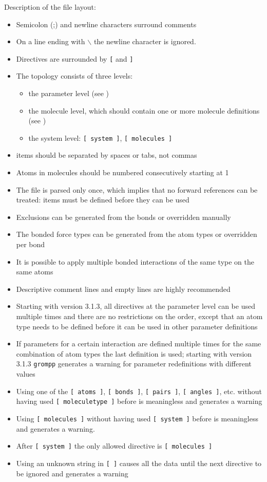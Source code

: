 Description of the file layout:
\begin{itemize}
\item Semicolon (;) and newline characters surround comments
\item On a line ending with $\backslash$ the newline character is ignored.
\item Directives are surrounded by {\tt [} and {\tt ]}
\item The topology consists of three levels:
\begin{itemize}
\item the parameter level (see )
\item the molecule level, which should contain one or more molecule
      definitions (see )
\item the system level: {\tt [~system~]}, {\tt [~molecules~]}
\end{itemize}
\item items should be separated by spaces or tabs, not commas
\item Atoms in molecules should be numbered consecutively starting at 1
\item The file is parsed only once, which implies that no forward
      references can be treated: items must be defined before they
      can be used
\item Exclusions can be generated from the bonds or
      overridden manually
\item The bonded force types can be generated from the atom types or
      overridden per bond
\item It is possible to apply multiple bonded interactions of the same type
      on the same atoms
\item Descriptive comment lines and empty lines are highly recommended
\item Starting with {\gromacs} version 3.1.3, all directives at the
      parameter level can be used multiple times and there are no
      restrictions on the order, except that an atom type needs to be
      defined before it can be used in other parameter definitions
\item If parameters for a certain interaction are defined multiple times
      for the same combination of atom types the last definition is used;
      starting with {\gromacs} version 3.1.3 {\tt grompp} generates a
      warning for parameter redefinitions with different values
\item Using one of the {\tt [~atoms~]}, {\tt [~bonds~]},
      {\tt [~pairs~]}, {\tt [~angles~]}, etc. without having used
      {\tt [~moleculetype~]}
      before is meaningless and generates a warning
\item Using {\tt [~molecules~]} without having used
      {\tt [~system~]} before is meaningless and generates a warning.
\item After {\tt [~system~]} the only allowed directive is {\tt [~molecules~]}
\item Using an unknown string in {\tt [ ]} causes all the data until
      the next directive to be ignored and generates a warning
\end{itemize}

